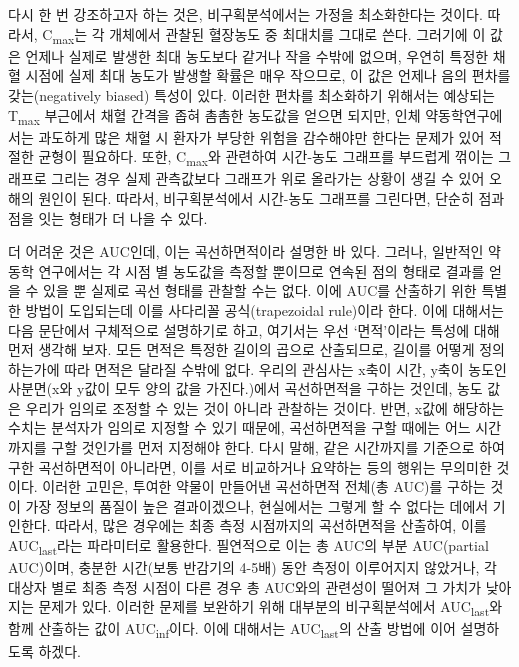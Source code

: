 \documentclass[
  11pt,
  krantz2, a4paper, twoside]{krantz}
\theoremstyle{definition}
\theoremstyle{definition}
\theoremstyle{definition}
\theoremstyle{definition}
\theoremstyle{remark}
\begin{document}
다시 한 번 강조하고자 하는 것은, 비구획분석에서는 가정을 최소화한다는 것이다.
따라서, C\textsubscript{max}는 각 개체에서 관찰된 혈장농도 중 최대치를 그대로 쓴다.
그러기에 이 값은 언제나 실제로 발생한 최대 농도보다 같거나 작을 수밖에 없으며, 우연히 특정한 채혈 시점에 실제 최대 농도가 발생할 확률은 매우 작으므로, 이 값은 언제나 음의 편차를 갖는(negatively biased) 특성이 있다.
이러한 편차를 최소화하기 위해서는 예상되는 T\textsubscript{max} 부근에서 채혈 간격을 좁혀 촘촘한 농도값을 얻으면 되지만, 인체 약동학연구에서는 과도하게 많은 채혈 시 환자가 부당한 위험을 감수해야만 한다는 문제가 있어 적절한 균형이 필요하다.
또한, C\textsubscript{max}와 관련하여 시간-농도 그래프를 부드럽게 꺾이는 그래프로 그리는 경우 실제 관측값보다 그래프가 위로 올라가는 상황이 생길 수 있어 오해의 원인이 된다.
따라서, 비구획분석에서 시간-농도 그래프를 그린다면, 단순히 점과 점을 잇는 형태가 더 나을 수 있다.

더 어려운 것은 AUC인데, 이는 곡선하면적이라 설명한 바 있다.
그러나, 일반적인 약동학 연구에서는 각 시점 별 농도값을 측정할 뿐이므로 연속된 점의 형태로 결과를 얻을 수 있을 뿐 실제로 곡선 형태를 관찰할 수는 없다. 
이에 AUC를 산출하기 위한 특별한 방법이 도입되는데 이를 사다리꼴 공식(trapezoidal rule)이라 한다.
이에 대해서는 다음 문단에서 구체적으로 설명하기로 하고, 여기서는 우선 `면적'이라는 특성에 대해 먼저 생각해 보자.
모든 면적은 특정한 길이의 곱으로 산출되므로, 길이를 어떻게 정의하는가에 따라 면적은 달라질 수밖에 없다.
우리의 관심사는 x축이 시간, y축이 농도인 사분면(x와 y값이 모두 양의 값을 가진다.)에서 곡선하면적을 구하는 것인데, 농도 값은 우리가 임의로 조정할 수 있는 것이 아니라 관찰하는 것이다.
반면, x값에 해당하는 수치는 분석자가 임의로 지정할 수 있기 때문에, 곡선하면적을 구할 때에는 어느 시간까지를 구할 것인가를 먼저 지정해야 한다.
다시 말해, 같은 시간까지를 기준으로 하여 구한 곡선하면적이 아니라면, 이를 서로 비교하거나 요약하는 등의 행위는 무의미한 것이다.
이러한 고민은, 투여한 약물이 만들어낸 곡선하면적 전체(총 AUC)를 구하는 것이 가장 정보의 품질이 높은 결과이겠으나, 현실에서는 그렇게 할 수 없다는 데에서 기인한다.
따라서, 많은 경우에는 최종 측정 시점까지의 곡선하면적을 산출하여, 이를 AUC\textsubscript{last}라는 파라미터로 활용한다.
필연적으로 이는 총 AUC의 부분 AUC(partial AUC)이며, 충분한 시간(보통 반감기의 4-5배) 동안 측정이 이루어지지 않았거나, 각 대상자 별로 최종 측정 시점이 다른 경우 총 AUC와의 관련성이 떨어져 그 가치가 낮아지는 문제가 있다. 
이러한 문제를 보완하기 위해 대부분의 비구획분석에서 AUC\textsubscript{last}와 함께 산출하는 값이 AUC\textsubscript{inf}이다.
이에 대해서는 AUC\textsubscript{last}의 산출 방법에 이어 설명하도록 하겠다.
\end{document}
